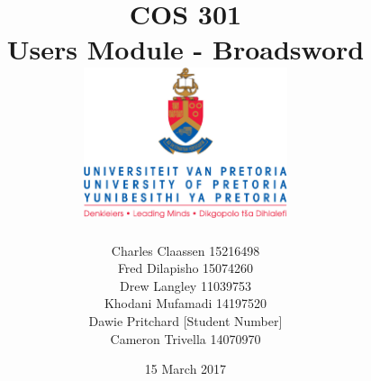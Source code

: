 \documentclass{article}
\title{COS 301 \\ Users Module - Broadsword \\[0.5cm] \includegraphics[width=6cm]{front-page}}
\author{Charles Claassen \hfill 15216498 \\ Fred Dilapisho \hfill 15074260 \\ Drew Langley \hfill 11039753 \\ Khodani Mufamadi \hfill 14197520 \\ Dawie Pritchard \hfill [Student Number]\\ Cameron Trivella \hfill 14070970}
\date{15 March 2017}
\begin{document}
\maketitle
\pagebreak
\tableofcontents
\pagebreak
\end{document}
